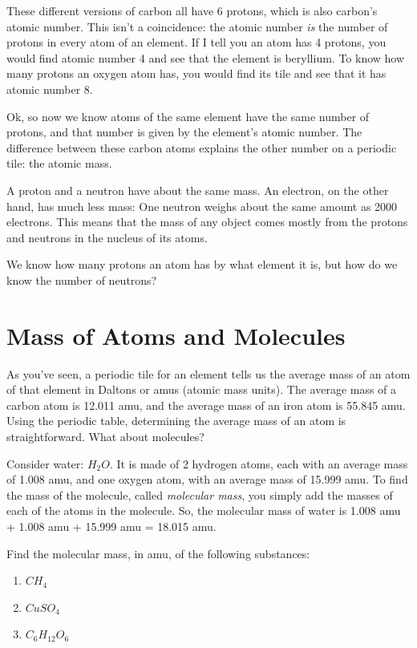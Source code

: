 These different versions of carbon all have 6 protons, which is also carbon's 
atomic number. This isn't a coincidence: the atomic number \textit{is} the number
of protons in every atom of an element. If I tell you an atom has 4 protons, you 
would find atomic number 4 and see that the element is beryllium. To know how many
protons an oxygen atom has, you would find its tile and see that it has atomic 
number 8. 

Ok, so now we know atoms of the same element have the same number of protons, and
that number is given by the element's atomic number. The difference between these
carbon atoms explains the other number on a periodic tile: the atomic mass. 

A proton and a neutron have about the same mass. An electron, on the other hand,
has much less mass: One neutron weighs about the same amount as 2000 electrons. 
This means that the mass of any object comes mostly from the protons and neutrons
in the nucleus of its atoms.  

We know how many protons an atom has by what element it is, but how do we know the 
number of neutrons?

\section{Mass of Atoms and Molecules}
As you've seen, a periodic tile for an element tells us the average mass of an 
atom of that element in Daltons or amus (atomic mass units). The average mass of a
carbon atom is 12.011 amu, and the average mass of an iron atom is 55.845 amu. 
Using the periodic table, determining the average mass of an atom is 
straightforward. What about molecules?

Consider water: $H_2 O$. It is made of 2 hydrogen atoms, each with an average 
mass of 1.008 amu, and one oxygen atom, with an average mass of 15.999 amu. To 
find the mass of the molecule, called \textit{molecular mass}, you simply add the 
masses of each of the atoms in the molecule. So, the molecular mass of water is 
1.008 amu + 1.008 amu + 15.999 amu = 18.015 amu. 

\begin{Exercise}[title = {Determining Molecular Mass}, label = molecular]
Find the molecular mass, in amu, of the following substances:
\begin{enumerate}
\item $CH_4$
\item $CuSO_4$
\item $C_6H_{12}O_6$
\end{enumerate}
\end{Exercise} 

